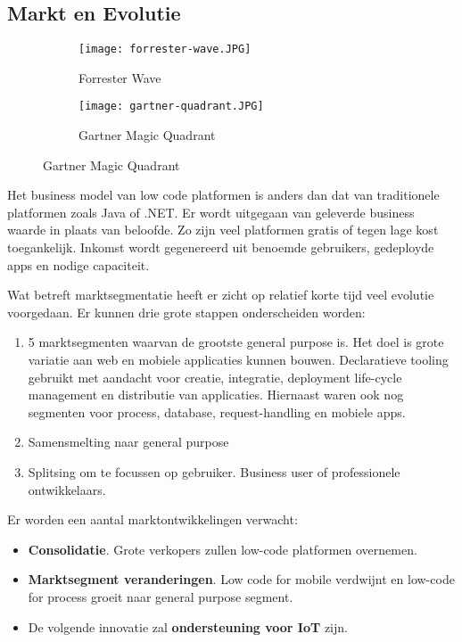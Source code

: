 \subsection{Markt en Evolutie}
\label{sec:markt-en-evolutie}

\begin{figure}[h!]
    \centering
    \begin{subfigure}[b]{0.4\linewidth}
        \texttt{[image: forrester-wave.JPG]}
        \caption{Forrester Wave \autocite{Rymer2019}}
    \end{subfigure}
    \begin{subfigure}[b]{0.4\linewidth}
        \texttt{[image: gartner-quadrant.JPG]}
        \caption{Gartner Magic Quadrant \autocite{Vincent2019}}
    \end{subfigure}
    \label{fig:quadwave}
\end{figure}

Het business model van low code platformen is anders dan dat van traditionele platformen zoals Java of .NET. Er wordt uitgegaan van geleverde business waarde in plaats van beloofde. Zo zijn veel platformen gratis of tegen lage kost toegankelijk. Inkomst wordt gegenereerd uit benoemde gebruikers, gedeployde apps en nodige capaciteit. \autocite{Richardson2016}

Wat betreft marktsegmentatie heeft er zicht op relatief korte tijd veel evolutie voorgedaan. Er kunnen drie grote stappen onderscheiden worden:
\begin{enumerate}
    \item 5 marktsegmenten waarvan de grootste general purpose is. Het doel is grote variatie aan web en mobiele applicaties kunnen bouwen. Declaratieve tooling gebruikt met aandacht voor creatie, integratie, deployment life-cycle management en distributie van applicaties. Hiernaast waren ook nog segmenten voor process, database, request-handling en mobiele apps.
    \item Samensmelting naar general purpose %
    \item Splitsing om te focussen op gebruiker. Business user of professionele ontwikkelaars. %
\end{enumerate}

Er worden een aantal marktontwikkelingen verwacht:
\begin{itemize}
    \item \textbf{Consolidatie}. Grote verkopers zullen low-code platformen overnemen.
    \item \textbf{Marktsegment veranderingen}. Low code for mobile verdwijnt en low-code for process groeit naar general purpose segment.
    \item De volgende innovatie zal \textbf{ondersteuning voor IoT} zijn.
\end{itemize} \autocite{Richardson2016}

